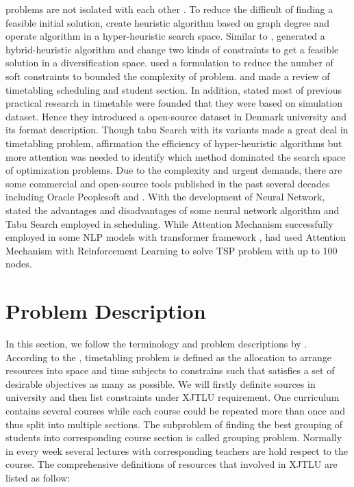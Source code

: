 \documentclass{article}
\begin{document}
problems are not isolated with each other \citep{()unitime}. To reduce the difficult of finding a feasible initial solution, \cite{(burke2007)graphbased} create heuristic algorithm based on graph degree and operate algorithm in a hyper-heuristic search space. Similar to \cite{(hertz1987)using}, \cite{(tuga2007)hybrid} generated a hybrid-heuristic algorithm and change two kinds of constraints to get a feasible solution in a diversification space. \cite{(burke2012)branchandcut} used a formulation to reduce the number of soft constraints to bounded the complexity of problem. \cite{(kristiansen2013)comprehensive} and \cite{(johnes2015)operational} made a review of timetabling scheduling and student section. In addition, \cite{(kristiansen2013)comprehensive} stated most of previous practical research in timetable were founded that they were based on simulation dataset. Hence they introduced a open-source dataset in Denmark university and its format description. Though tabu Search with its variants made a great deal in timetabling problem, \cite{(fazelzarandi2020)state} affirmation the efficiency of hyper-heuristic algorithms but more attention was needed to identify which method dominated the search space of optimization problems. Due to the complexity and urgent demands, there are some commercial and open-source tools published in the past several decades including Oracle Peoplesoft and \cite{()unitime}. With the development of Neural Network, \cite{(fazelzarandi2020)state} stated the advantages and disadvantages of some neural network algorithm and Tabu Search employed in scheduling. While Attention Mechanism successfully employed in some NLP models with transformer framework \citep{(ashishvaswani2017)attention,(devlin2019)bert}, \cite{(kool2019)attention} had used Attention Mechanism with Reinforcement Learning to solve TSP problem with up to 100 nodes.


\section{Problem Description}
\label{sec: Problem Description}

In this section, we follow the terminology and problem descriptions by \cite{(werra1985)introduction}. According to the \cite{(wren1996)scheduling}, timetabling problem is defined as the allocation to arrange resources into space and time subjects to constrains such that satisfies a set of desirable objectives as many as possible. We will firstly definite sources in university and then list constraints under XJTLU requirement. One curriculum contains several courses while each course could be repeated more than once and thus split into multiple sections. The subproblem of finding the best grouping of students into corresponding course section is called grouping problem. Normally in every week several lectures with corresponding teachers are hold respect to the course. The comprehensive definitions of resources that involved in XJTLU are listed as follow:
\end{document}
